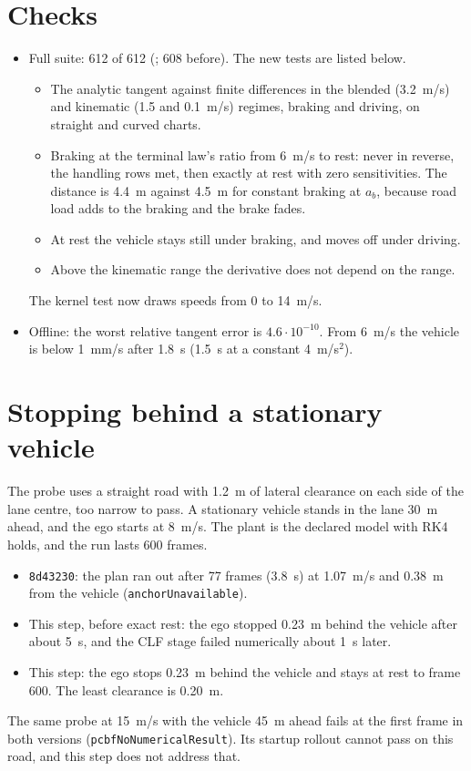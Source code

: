 \documentclass[11pt]{article}
\begin{document}
\section{Checks}
\begin{itemize}
\item Full suite: 612 of 612 (; 608 before). The new tests
  are listed below.
  \begin{itemize}
  \item The analytic tangent against finite differences in the blended
    (3.2~m/s) and kinematic (1.5 and 0.1~m/s) regimes, braking and
    driving, on straight and curved charts.
  \item Braking at the terminal law's ratio from 6~m/s to rest: never in
    reverse, the handling rows met, then exactly at rest with zero
    sensitivities. The distance is 4.4~m against 4.5~m for constant
    braking at $a_b$, because road load adds to the braking and the brake
    fades.
  \item At rest the vehicle stays still under braking, and moves off under
    driving.
  \item Above the kinematic range the derivative does not depend on the
    range.
  \end{itemize}
  The kernel test now draws speeds from 0 to 14~m/s.
\item Offline: the worst relative tangent error is $4.6\cdot10^{-10}$. From
  6~m/s the vehicle is below 1~mm/s after 1.8~s (1.5~s at a constant
  4~m/s$^2$).
\end{itemize}

\section{Stopping behind a stationary vehicle}
The probe uses a straight road with 1.2~m of lateral clearance on each side
of the lane centre, too narrow to pass. A stationary vehicle stands in the
lane 30~m ahead, and the ego starts at 8~m/s. The plant is the declared model
with RK4 holds, and the run lasts 600 frames.
\begin{itemize}
\item \texttt{8d43230}: the plan ran out after 77 frames (3.8~s) at 1.07~m/s
  and 0.38~m from the vehicle (\texttt{anchorUnavailable}).
\item This step, before exact rest: the ego stopped 0.23~m behind the
  vehicle after about 5~s, and the CLF stage failed numerically about 1~s
  later.
\item This step: the ego stops 0.23~m behind the vehicle and stays at rest
  to frame 600. The least clearance is 0.20~m.
\end{itemize}
The same probe at 15~m/s with the vehicle 45~m ahead fails at the first
frame in both versions (\texttt{pcbfNoNumericalResult}). Its startup
rollout cannot pass on this road, and this step does not address that.
\end{document}
